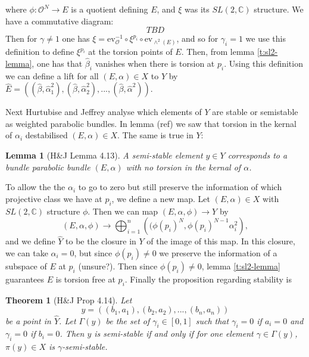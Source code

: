 \documentclass[]{article}
\newtheorem{lemma}{Lemma}
\newtheorem{theorem}{Theorem}
\newcommand{\C}{\mathbb{C}}
\newcommand{\OO}{\mathcal{O}}
\begin{document}
	where $\phi:\OO^N \to E$ is a quotient defining $E$, and $\xi$ was its $SL(2,\C)$ structure. We have a commutative diagram:
	\begin{equation}
		TBD
	\end{equation}
	Then for $\gamma \neq 1$ one has $\xi = \text{ev}_\OO^{-1}\circ \xi^{p_i} \circ \text{ev}_{\wedge^2(E)}$, and so for $\gamma_i=1$ we use this definition to define $\xi^{p_i}$ at the torsion points of $E$. Then, from lemma \ref{t:sl2-lemma}, one has that $\hat{\beta}_i$ vanishes when there is torsion at $p_i$. Using this definition we can define a lift for all $(E,\alpha)\in X$ to $Y$ by $
	\hat{E} = \left(
	(\hat{\beta}, \hat{\alpha}_1^2),(\hat{\beta},\hat{\alpha}_2^2),...,(\hat{\beta},\hat{\alpha}^2)
	\right).$
	
	Next Hurtubise and Jeffrey analyse which elements of $Y$ are stable or semistable as weighted parabolic bundles. In lemma (ref) we saw that torsion in the kernal of $\alpha_i$ destabilised $(E,\alpha) \in X$. The same is true in $Y$:
	\begin{lemma}[H\&J Lemma 4.13]
		A semi-stable element $y\in Y$ corresponds to a bundle parabolic bundle $(E,\alpha)$ with no torsion in the kernal of $\alpha$.
	\end{lemma}
	To allow the the $\alpha_i$ to go to zero but still preserve the information of which projective class we have at $p_i$, we define a new map. Let $(E,\alpha)\in X$ with $SL(2,\C)$ structure $\phi$. Then we can map $(E,\alpha,\phi)\to Y$ by
	\begin{equation}
		(E,\alpha,\phi) \to \bigoplus_{i=1}^n\left(
		(\phi(p_i)^N, \phi(p_i)^{N-1}\alpha_i^2
		\right),
	\end{equation}
	and we define $\hat{Y}$ to be the closure in $Y$ of the image of this map. In this closure, we can take $\alpha_i =0$, but since $\phi(p_i)\neq 0$ we preserve the information of a subspace of $E$ at $p_i$ (unsure?). Then since $\phi(p_i)\neq 0$, lemma \ref{t:sl2-lemma} guarantees $E$ is torsion free at $p_i$. Finally the proposition regarding stability is
	\begin{theorem}[H\&J Prop 4.14]
		Let 
		\begin{equation}
			y = \left(
			(b_1, a_1), (b_2, a_2),...,(b_n, a_n)
			\right)
		\end{equation}
		be a point in $\hat{Y}$. Let $\Gamma(y)$ be the set of $\gamma_i \in [0,1]$ such that $\gamma_i =0$ if $a_i =0$ and $\gamma_i = 0$ if $b_i = 0$. Then $y$ is semi-stable if and only if for one element $\gamma \in \Gamma(y)$, $\pi(y)\in X$ is $\gamma$-semi-stable.
	\end{theorem}
\end{document}
